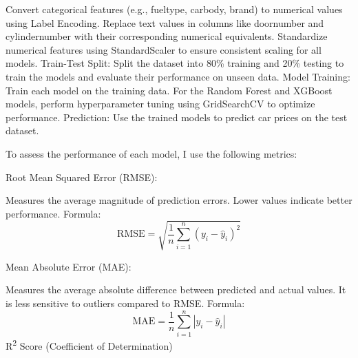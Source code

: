 \documentclass[journal]{IEEEtran}
\begin{document}
Convert categorical features (e.g., fueltype, carbody, brand) to numerical values using Label Encoding.
Replace text values in columns like doornumber and cylindernumber with their corresponding numerical equivalents.
Standardize numerical features using StandardScaler to ensure consistent scaling for all models.\vspace{2mm}
\newline
Train-Test Split:\vspace{2mm}
\newline
Split the dataset into 80\% training and 20\% testing to train the models and evaluate their performance on unseen data.\vspace{2mm}
\newline
Model Training:\vspace{2mm}
\newline
Train each model on the training data.
For the Random Forest and XGBoost models, perform hyperparameter tuning using GridSearchCV to optimize performance.\vspace{2mm}
\newline
Prediction:\vspace{2mm}
\newline
Use the trained models to predict car prices on the test dataset.
\newline

To assess the performance of each model, I use the following metrics:

Root Mean Squared Error (RMSE):\vspace{2mm}

Measures the average magnitude of prediction errors. Lower values indicate better performance.\newline
Formula:\newline
\[
\text{RMSE} = \sqrt{\frac{1}{n} \sum_{i=1}^n (y_i - \hat{y}_i)^2}
\]

\vspace{5mm}
Mean Absolute Error (MAE):\vspace{2mm}

Measures the average absolute difference between predicted and actual values. It is less sensitive to outliers compared to RMSE.\newline
Formula:
\[
\text{MAE} = \frac{1}{n} \sum_{i=1}^n |y_i - \hat{y}_i|
\]
\vspace{5mm}
R\textsuperscript{2} Score (Coefficient of Determination)
\end{document}
